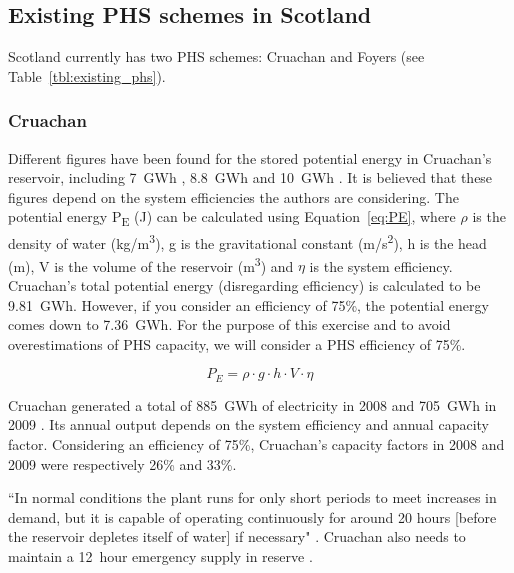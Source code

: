 
\subsection{Existing PHS schemes in Scotland}

Scotland currently has two PHS schemes: Cruachan and Foyers (see Table~\ref{tbl:existing_phs}).





\subsubsection{Cruachan}

Different figures have been found for the stored potential energy in Cruachan's reservoir, including 7~GWh \citep{Strettle2013}, 8.8~GWh \citep{ESMStudy2010} and 10~GWh \citep{MacKayDavid2009}.
It is believed that these figures depend on the system efficiencies the authors are considering.
The potential energy P\textsubscript{E} (J) can be calculated using Equation~\ref{eq:PE}, where $\rho$ is the density of water (kg/m\textsuperscript{3}), g is the gravitational constant (m/s\textsuperscript{2}), h is the head (m), V is the volume of the reservoir (m\textsuperscript{3}) and $\eta$ is the system efficiency.
Cruachan's total potential energy (disregarding efficiency) is calculated to be 9.81~GWh.
However, if you consider an efficiency of 75\%, the potential energy comes down to 7.36~GWh.
For the purpose of this exercise and to avoid overestimations of PHS capacity, we will consider a PHS efficiency of 75\%.

	\begin{equation}\label{eq:PE}
		P_E = \rho \cdot g \cdot h \cdot V \cdot \eta
	\end{equation}

Cruachan generated a total of 885~GWh of electricity in 2008 and 705~GWh in 2009 \citep{ScottishPowernd}.
Its annual output depends on the system efficiency and annual capacity factor.
Considering an efficiency of 75\%, Cruachan's capacity factors in 2008 and 2009 were respectively 26\% and 33\%.

``In normal conditions the plant runs for only short periods to meet increases in demand, but it is capable of operating 
continuously for around 20 hours [before the reservoir depletes itself of water] if necessary" \citep{ScottishPowernd, Mearns2018}.
Cruachan also needs to maintain a 12~hour emergency supply in reserve \citep{Mearns2018}.



